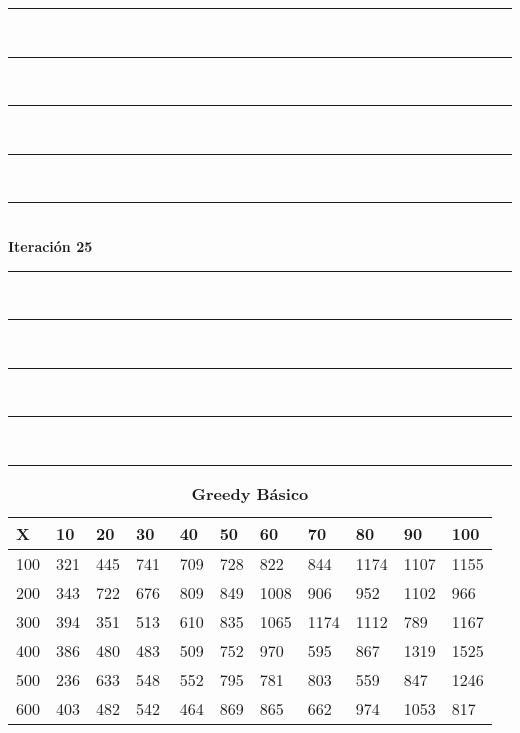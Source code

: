 \documentclass[10pt,letterpaper]{article}
\begin{document}
\newpage 
\begin{center}
\newcommand{\HRule}{\rule{\linewidth}{0.5mm}}
\center
\HRule\\[6cm]
\HRule\\[0.4cm]
\HRule\\[0.4cm]
\HRule\\[0.4cm]
\HRule\\[0.4cm]
{\centering \Huge\bfseries Iteración 25}\\[0.4cm]
\HRule\\[0.4cm]
\HRule\\[0.4cm]
\HRule\\[0.4cm]
\HRule\\[6cm]
\HRule
\end{center}
\newpage 
{}
\begin{center}
\begin{table}\renewcommand{\arraystretch}{2.5}
\caption{\large \textbf{Greedy Básico}}
\centering
\begin{tabular} { |m{0.5cm}|m{1.3cm}|m{1.3cm}|m{1.3cm}|m{1.3cm}|m{1.3cm}|m{1.3cm}|m{1.3cm}|m{1.3cm}|m{1.3cm}|m{1.3cm}|} 
\hline
\rowcolor{Gray}
\centering \textbf{X} & \centering \textbf{10} & \centering \textbf{20} & \centering \textbf{30}\ & \centering \textbf{40} & \centering \textbf{50} & \centering \textbf{60}\ & \centering \textbf{70} & \centering \textbf{80} & \centering \textbf{90}\ & \textbf{100} \\\hline
\cellcolor{Gray}100 & \Large 321 & \Large 445 & \Large 741 & \Large 709 & \Large 728 & \Large 822 & \Large 844 & \Large 1174 & \Large 1107 & \Large 1155 \\
\hline
\cellcolor{Gray}200 & \Large 343 & \Large 722 & \Large 676 & \Large 809 & \Large 849 & \Large 1008 & \Large 906 & \Large 952 & \Large 1102 & \Large 966 \\
\hline
\cellcolor{Gray}300 & \Large 394 & \Large 351 & \Large 513 & \Large 610 & \Large 835 & \Large 1065 & \Large 1174 & \Large 1112 & \Large 789 & \Large 1167 \\
\hline
\cellcolor{Gray}400 & \Large 386 & \Large 480 & \Large 483 & \Large 509 & \Large 752 & \Large 970 & \Large 595 & \Large 867 & \Large 1319 & \Large 1525 \\
\hline
\cellcolor{Gray}500 & \Large 236 & \Large 633 & \Large 548 & \Large 552 & \Large 795 & \Large 781 & \Large 803 & \Large 559 & \Large 847 & \Large 1246 \\
\hline
\cellcolor{Gray}600 & \Large 403 & \Large 482 & \Large 542 & \Large 464 & \Large 869 & \Large 865 & \Large 662 & \Large 974 & \Large 1053 & \Large 817 \\

\end{tabular}
\end{table}
\end{center}
\end{document}
